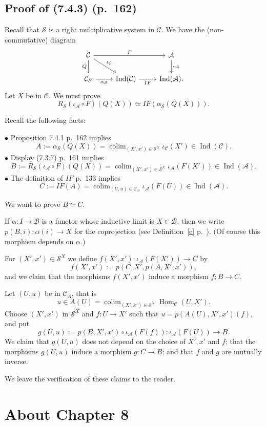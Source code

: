 \documentclass[12pt]{article}
\theoremstyle{remark}
\theoremstyle{definition}
\newcommand{\bu}{\bullet}
\newcommand{\A}{\mathcal A}
\newcommand{\B}{\mathcal B}
\newcommand{\C}{\mathcal C}
\newcommand{\SSS}{\mathcal S}
\newcommand{\cn}{(See (\ref{convnot}) p.~\pageref{convnot} for an explanation of the notation.) }%
\DeclareMathOperator*{\coli}{colim}
\DeclareMathOperator*{\co}{colim}
\DeclareMathOperator{\Hom}{Hom}%
\DeclareMathOperator{\Ind}{Ind}
\begin{document}
\subsection{Proof of (7.4.3) (p.~162)}
%
Recall that $\SSS$ is a right multiplicative system in $\C$. We have the (non-commutative) diagram
$$
\begin{tikzcd}
\C\ar{rr}{F}\ar{d}[swap]{Q}\ar{dr}{\iota_\C}&&\A\ar{d}{\iota_\A}\\ 
\C_\SSS\ar{r}[swap]{\alpha_\SSS}&\Ind(\C)\ar{r}[swap]{IF}&\Ind(\A).
\end{tikzcd}
$$
Let $X$ be in $\C$. We must prove 
$$
R_\SSS(\iota_\A\circ F)(Q(X))\simeq IF(\alpha_\SSS(Q(X))).
$$

Recall the following facts: 

\noindent$\bu$ Proposition 7.4.1 p.~162 implies
$$
A:=\alpha_\SSS(Q(X))=\coli_{(X',x')\in\SSS^X}\iota_\C(X')\in\Ind(\C).
$$ 
$\bu$ Display (7.3.7) p.~161 implies
$$
B:=R_\SSS(\iota_\A\circ F)(Q(X))=\coli_{(X',x')\in\SSS^X}\iota_\A(F(X'))\in\Ind(\A).
$$
$\bu$ The definition of $IF$ p.~133 implies
$$
C:=IF(A)=\coli_{(U,u)\in\C_A}\iota_\A(F(U))\in\Ind(\A).
$$ 

We want to prove $B\simeq C$.

 If $\alpha:I\to\B$ is a functor whose inductive limit is $X\in\B$, then we write $p(B,i):\alpha(i)\to X$ for the coprojection (see Definition~\ref{c} p.~\pageref{c}). (Of course this morphism depends on $\alpha$.) 

For $(X',x')\in\SSS^X$ we define $f(X',x'):\iota_\A(F(X'))\to C$ by 
$$
f(X',x'):=p(C,X',p(A,X',x')),
$$ 
and we claim that the morphisms $f(X',x')$ induce a morphism $f:B\to C$. 

Let $(U,u)$ be in $\C_A$, that is
$$
u\in A(U)=\co_{(X',x')\in\SSS^X}\Hom_\C(U,X').
$$ 
Choose $(X',x')$ in $\SSS^X$ and $f:U\to X'$ such that $u=p(A(U),X',x')(f)$, and put 
$$
g(U,u):=p(B,X',x')\circ\iota_\A(F(f)):\iota_\A(F(U))\to B.
$$ 
We claim that $g(U,u)$ does not depend on the choice of $X',x'$ and $f$; that the morphisms $g(U,u)$ induce a morphism $g:C\to B$; and that $f$ and $g$ are mutually inverse. 

We leave the verification of these claims to the reader. 
%
%
\section{About Chapter 8}
%
\end{document}
